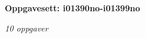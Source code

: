 \centerline{\bf Oppgavesett: i01390no-i01399no}
\vskip 10pt
\centerline{\it 10 oppgaver}\vskip 10pt
\vskip 10pt
